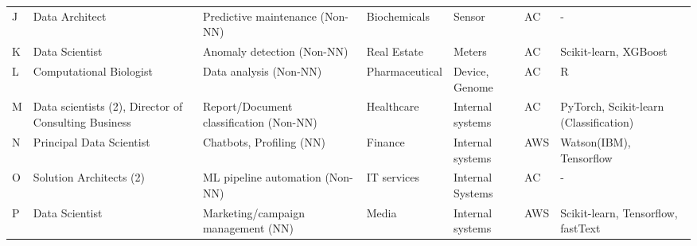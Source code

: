 \begin{table*}[t]
\begin{tabular}{p{}p{}p{3cm}p{}p{2cm}p{}p{}}
    J & Data Architect & Predictive maintenance (Non-NN) & Biochemicals & Sensor & AC & - \\
    K & Data Scientist & Anomaly detection (Non-NN) & Real Estate & Meters & AC & Scikit-learn, XGBoost \\
    L & Computational Biologist & Data analysis (Non-NN) & Pharmaceutical & Device,  Genome & AC & R \\
    M & Data scientists (2), Director of Consulting Business  & Report/Document classification (Non-NN) & Healthcare & Internal systems & AC & PyTorch, Scikit-learn (Classification) \\
    N & Principal Data Scientist & Chatbots, Profiling (NN) & Finance & Internal systems & AWS & Watson(IBM), Tensorflow \\
    O & Solution Architects (2)& ML pipeline automation (Non-NN) & IT services & Internal Systems & AC & - \\
    P & Data Scientist & Marketing/campaign management (NN) & Media & Internal systems & AWS & Scikit-learn, Tensorflow, fastText \\
    \hline
    
   
    
    \end{tabular}%
  \label{tab:data_source_storage_mlframeworks_interviewees}%
\end{table*}%